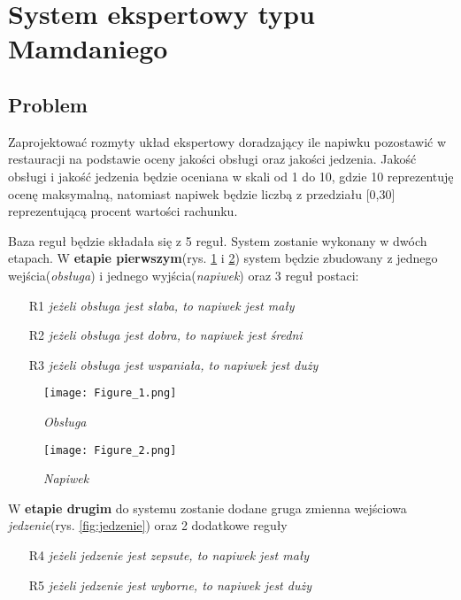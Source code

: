 \section{System ekspertowy typu Mamdaniego}\label{sec:expert_system}
\subsection{Problem}\label{subsec:problem}

Zaprojektować rozmyty układ ekspertowy doradzający ile napiwku pozostawić w restauracji na podstawie oceny jakości obsługi oraz jakości jedzenia. Jakość obsługi i jakość jedzenia będzie oceniana w skali od 1 do 10, gdzie 10 reprezentuję ocenę maksymalną, natomiast napiwek będzie liczbą z przedziału [0,30] reprezentującą procent wartości rachunku.

Baza reguł będzie składała się z 5 reguł. System zostanie wykonany w dwóch etapach. W \textbf{etapie pierwszym}(rys. \ref{fig:obsluga} i \ref{fig:napiwek}) system będzie zbudowany z jednego wejścia(\emph{obsługa}) i jednego wyjścia(\emph{napiwek}) oraz 3 reguł postaci:
\begin{itemize}
	\item[R1] \emph{jeżeli obsługa jest słaba, to napiwek jest mały}
	\item[R2] \emph{jeżeli obsługa jest dobra, to napiwek jest średni}
	\item[R3] \emph{jeżeli obsługa jest wspaniała, to napiwek jest duży}
\end{itemize}

\begin{figure}[H]
	\centering
	\texttt{[image: Figure\_1.png]}
	\caption{\textit{Obsługa}}
	\label{fig:obsluga}
\end{figure}

\begin{figure}[H]
	\centering
	\texttt{[image: Figure\_2.png]}
	\caption{\textit{Napiwek}}
	\label{fig:napiwek}
\end{figure}

W \textbf{etapie drugim} do systemu zostanie dodane gruga zmienna wejściowa \emph{jedzenie}(rys. \ref{fig:jedzenie}) oraz 2 dodatkowe reguły
\begin{itemize}
	\item[R4] \emph{jeżeli jedzenie jest zepsute, to napiwek jest mały}
	\item[R5] \emph{jeżeli jedzenie jest wyborne, to napiwek jest duży}
\end{itemize}

